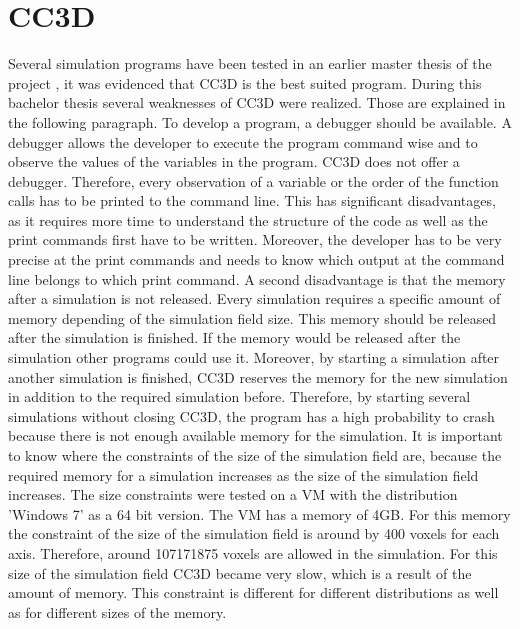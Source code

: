 \section{CC3D}
Several simulation programs have been tested in an earlier master thesis of the project \cite{MSCAngelo}, it was evidenced that \ac{CC3D} is the best suited program. During this bachelor thesis several weaknesses of \ac{CC3D} were realized. Those are explained in the following paragraph. \newline
To develop a program, a debugger should be available. A debugger allows the developer to execute the program command wise and to observe the values of the variables in the program. \ac{CC3D} does not offer a debugger. Therefore, every observation of a variable or the order of the function calls has to be printed to the command line. This has significant disadvantages, as it requires more time to understand the structure of the code as well as the print commands first have to be written. Moreover, the developer has to be very precise at the print commands and needs to know which output at the command line belongs to which print command. \newline
A second disadvantage is that the memory after a simulation is not released. Every simulation requires a specific amount of memory depending of the simulation field size. This memory should be released after the simulation is finished. If the memory would be released after the simulation other programs could use it. Moreover, by starting a simulation after another simulation is finished, \ac{CC3D} reserves the memory for the new simulation in addition to the required simulation before. Therefore, by starting several simulations without closing \ac{CC3D}, the program has a high probability to crash because there is not enough available memory for the simulation. \newline
It is important to know where the constraints of the size of the simulation field are, because the required memory for a simulation increases as the size of the simulation field increases. The size constraints were tested on a \ac{VM} with the distribution 'Windows 7' as a 64 bit version. The \ac{VM} has a memory of 4GB. For this memory the constraint of the size of the simulation field is around by 400 voxels for each axis. Therefore, around 107171875 voxels are allowed in the simulation. For this size of the simulation field \ac{CC3D} became very slow, which is a result of the amount of memory. This constraint is different for different distributions as well as for different sizes of the memory.


